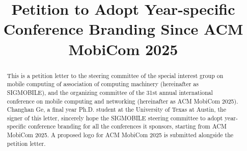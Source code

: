 \documentclass[sigconf, 10pt]{acmart}
\begin{document}
\title{Petition to Adopt Year-specific Conference Branding Since ACM MobiCom 2025}

\newcommand{\wrt}{{\em w.r.t. }}
\newcommand{\para}[1]{\smallskip\noindent {\bf #1}}

\setlength{\abovecaptionskip}{0pt}
\setlength{\belowcaptionskip}{0pt}
\setlength{\abovedisplayshortskip}{0pt}
\setlength{\belowdisplayshortskip}{0pt}
\setlength{\textfloatsep}{0pt}

\begin{abstract}
This is a petition letter to the steering committee of the special interest group on mobile computing of association of computing machinery (hereinafter as SIGMOBILE), and the organizing committee of the 31st annual international conference on mobile computing and networking (hereinafter as ACM MobiCom 2025). Changhan Ge, a final year Ph.D. student at the University of Texas at Austin, the signer of this letter, sincerely hope the SIGMOBILE steering committee to adopt year-specific conference branding for all the conferences it sponsors, starting from ACM MobiCom 2025. A proposed logo for ACM MobiCom 2025 is submitted alongside the petition letter.
\end{abstract}




\maketitle
\end{document}
